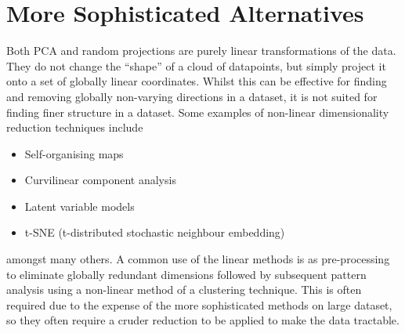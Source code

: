 \documentclass[12pt,a4paper]{tufte-handout}
\begin{document}
\section{More Sophisticated Alternatives}
Both PCA and random projections are purely linear transformations of the data. They do not change the ``shape'' of a cloud of datapoints, but simply project it onto a set of globally linear coordinates. Whilst this can be effective for finding and removing globally non-varying directions in a dataset, it is not suited for finding finer structure in a dataset. Some examples of non-linear dimensionality reduction techniques include
\begin{itemize}
  \item Self-organising maps
  \item Curvilinear component analysis
  \item Latent variable models
  \item t-SNE (t-distributed stochastic neighbour embedding)
\end{itemize}
amongst many others. A common use of the linear methods is as pre-processing to eliminate globally redundant dimensions followed by subsequent pattern analysis using a non-linear method of a clustering technique. This is often required due to the expense of the more sophisticated methods on large dataset, so they often require a cruder reduction to be applied to make the data tractable.
\end{document}
